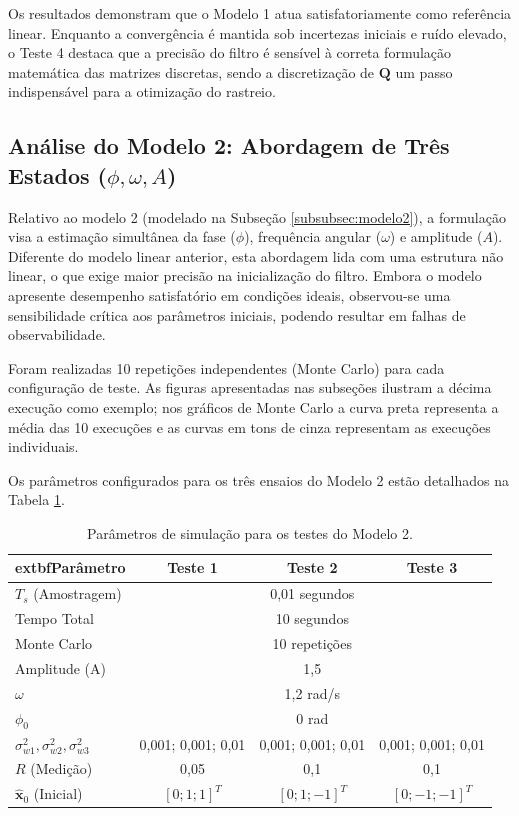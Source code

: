 \documentclass[a4paper,12pt]{article}
\begin{document}
Os resultados demonstram que o Modelo 1 atua satisfatoriamente como referência linear. Enquanto a convergência é mantida sob incertezas iniciais e ruído elevado, o Teste 4 destaca que a precisão do filtro é sensível à correta formulação matemática das matrizes discretas, sendo a discretização de $\mathbf{Q}$ um passo indispensável para a otimização do rastreio.

\subsection{Análise do Modelo 2: Abordagem de Três Estados ($\phi, \omega, A$)}
\label{subsec:resultados_mod2}

Relativo ao modelo 2 (modelado na Subseção \ref{subsubsec:modelo2}), a formulação visa a estimação simultânea da fase ($\phi$), frequência angular ($\omega$) e amplitude ($A$). Diferente do modelo linear anterior, esta abordagem lida com uma estrutura não linear, o que exige maior precisão na inicialização do filtro. Embora o modelo apresente desempenho satisfatório em condições ideais, observou-se uma sensibilidade crítica aos parâmetros iniciais, podendo resultar em falhas de observabilidade.

Foram realizadas 10 repetições independentes (Monte Carlo) para cada configuração de teste. As figuras apresentadas nas subseções ilustram a décima execução como exemplo; nos gráficos de Monte Carlo a curva preta representa a média das 10 execuções e as curvas em tons de cinza representam as execuções individuais.

Os parâmetros configurados para os três ensaios do Modelo 2 estão detalhados na Tabela \ref{tab:parametros_m2}.

\begin{table}[H]
\centering
\caption{Parâmetros de simulação para os testes do Modelo 2.}
\label{tab:parametros_m2}
\begin{tabular}{l|c|c|c}
\hline
	extbf{Parâmetro} & \textbf{Teste 1} & \textbf{Teste 2} & \textbf{Teste 3} \\ \hline
$T_s$ (Amostragem) & \multicolumn{3}{c}{0,01 segundos} \\
Tempo Total & \multicolumn{3}{c}{10 segundos} \\ 
Monte Carlo & \multicolumn{3}{c}{10 repetições} \\ 
Amplitude (A) & \multicolumn{3}{c}{1,5} \\ 
$\omega$ & \multicolumn{3}{c}{1,2 rad/s} \\ 
$\phi_0$ & \multicolumn{3}{c}{0 rad} \\ \hline
$\sigma^2_{w1}, \sigma^2_{w2}, \sigma^2_{w3}$ & 0,001; 0,001; 0,01 & 0,001; 0,001; 0,01 & 0,001; 0,001; 0,01 \\ 
$R$ (Medição) & 0,05 & 0,1 & 0,1 \\ 
$\hat{\mathbf{x}}_0$ (Inicial) & $[0; 1; 1]^T$ & $[0; 1; -1]^T$ & $[0; -1; -1]^T$ \\ \hline
\end{tabular}
\end{table}
\end{document}
